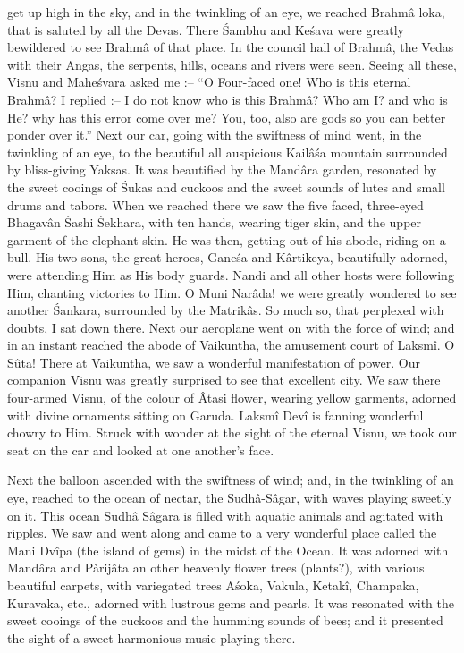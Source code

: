 get up high in the sky, and in the twinkling of an eye, we reached Brahm\^a loka, that is saluted by all the Devas. There \'Sambhu and Ke\'sava were greatly bewildered to see Brahm\^a of that place. In the council hall of Brahm\^a, the Vedas with their Angas, the serpents, hills, oceans and rivers were seen. Seeing all these, Visnu and Mahe\'svara asked me :-- ``O Four-faced one! Who is this eternal Brahm\^a? I replied :-- I do not know who is this Brahm\^a? Who am I? and who is He? why has this error come over me? You, too, also are gods so you can better ponder over it.'' Next our car, going with the swiftness of mind went, in the twinkling of an eye, to the beautiful all auspicious Kail\^a\'sa mountain surrounded by bliss-giving Yaksas. It was beautified by the Mand\^ara garden, resonated by the sweet cooings of \'Sukas and cuckoos and the sweet sounds of lutes and small drums and tabors. When we reached there we saw the five faced, three-eyed Bhagav\^an \'Sashi \'Sekhara, with ten hands, wearing tiger skin, and the upper garment of the elephant skin. He was then, getting out of his abode, riding on a bull. His two sons, the great heroes, Gane\'sa and K\^artikeya, beautifully adorned, were attending Him as His body guards. Nandi and all other hosts were following Him, chanting victories to Him. O Muni Nar\^ada! we were greatly wondered to see another \'Sankara, surrounded by the Matrik\^as. So much so, that perplexed with doubts, I sat down there. Next our aeroplane went on with the force of wind; and in an instant reached the abode of Vaikuntha, the amusement court of Laksm\^i. O Sûta! There at Vaikuntha, we saw a wonderful manifestation of power. Our companion Visnu was greatly surprised to see that excellent city. We saw there four-armed Visnu, of the colour of Âtasi flower, wearing yellow garments, adorned with divine ornaments sitting on Garuda. Laksm\^i Dev\^i is fanning wonderful chowry to Him. Struck with wonder at the sight of the eternal Visnu, we took our seat on the car and looked at one another's face.

Next the balloon ascended with the swiftness of wind; and, in the twinkling of an eye, reached to the ocean of nectar, the Sudh\^a-S\^agar, with waves playing sweetly on it. This ocean Sudh\^a S\^agara is filled with aquatic animals and agitated with ripples. We saw and went along and came to a very wonderful place called the Mani Dv\^ipa (the island of gems) in the midst of the Ocean. It was adorned with Mand\^ara and Pàrij\^ata an other heavenly flower trees (plants?), with various beautiful carpets, with variegated trees A\'soka, Vakula, Ketak\^i, Champaka, Kuravaka, etc., adorned with lustrous gems and pearls. It was resonated with the sweet cooings of the cuckoos and the humming sounds of bees; and it presented the sight of a sweet harmonious music playing there.

